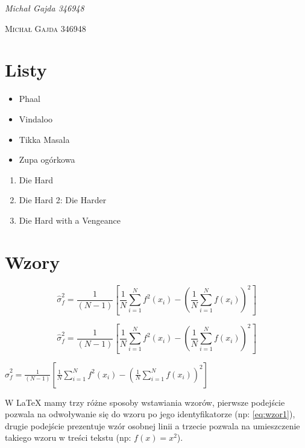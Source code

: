 \documentclass[12pt,a4paper]{article}
\begin{document}
{\itshape Michał Gajda 346948} %

{\scshape Michał Gajda 346948} %


\newpage
\section{Listy}

\begin{itemize}
\item Phaal
\item Vindaloo
\item Tikka Masala
\item Zupa ogórkowa
\end{itemize}

\begin{enumerate}
\item Die Hard
\item Die Hard 2: Die Harder
\item Die Hard with a Vengeance
\end{enumerate}

\newpage
\section{Wzory}

\begin{equation} %
\label{eq:wzor1}
\hat{\sigma}^2_f = \frac{1}{(N - 1)} \left[\frac{1}{N} \sum_{i=1}^{N} f^2(x_i) - \left(\frac{1}{N} \sum_{i=1}^{N} f(x_i)\right)^2\right]
\end{equation}

\[ %
\hat{\sigma}^2_f = \frac{1}{(N - 1)} \left[\frac{1}{N} \sum_{i=1}^{N} f^2(x_i) - \left(\frac{1}{N} \sum_{i=1}^{N} f(x_i)\right)^2\right]
\]

$\hat{\sigma}^2_f = \frac{1}{(N - 1)} \left[\frac{1}{N} \sum_{i=1}^{N} f^2(x_i) - \left(\frac{1}{N} \sum_{i=1}^{N} f(x_i)\right)^2\right]$ %

W LaTeX mamy trzy różne sposoby wstawiania wzorów, pierwsze podejście pozwala na odwoływanie się do wzoru po jego identyfikatorze (np: \eqref{eq:wzor1}), drugie podejście prezentuje wzór osobnej linii a trzecie pozwala na umieszczenie takiego wzoru w treści tekstu (np: $f(x) = x^2$).
\end{document}
